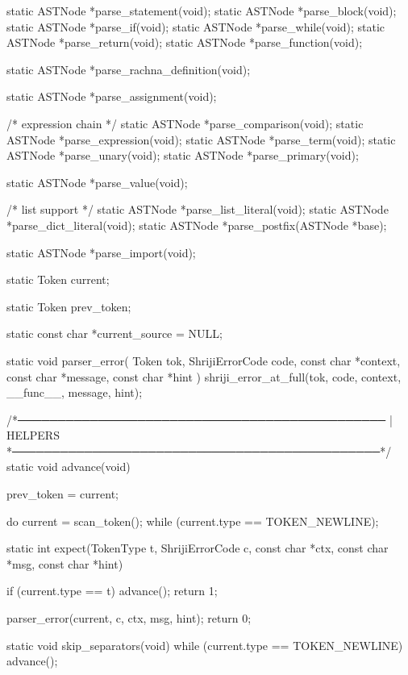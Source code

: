 \documentclass{article}
\begin{document}
static ASTNode *parse_statement(void);
static ASTNode *parse_block(void);
static ASTNode *parse_if(void);
static ASTNode *parse_while(void);
static ASTNode *parse_return(void);
static ASTNode *parse_function(void);

static ASTNode *parse_rachna_definition(void);

static ASTNode *parse_assignment(void);

/* expression chain */
static ASTNode *parse_comparison(void);
static ASTNode *parse_expression(void);
static ASTNode *parse_term(void);
static ASTNode *parse_unary(void);
static ASTNode *parse_primary(void);

static ASTNode *parse_value(void);

/* list support */
static ASTNode *parse_list_literal(void);
static ASTNode *parse_dict_literal(void);
static ASTNode *parse_postfix(ASTNode *base);

static ASTNode *parse_import(void);

static Token current;

static Token prev_token;

static const char *current_source = NULL;

static void parser_error(
    Token tok,
    ShrijiErrorCode code,
    const char *context,
    const char *message,
    const char *hint
)
{
    shriji_error_at_full(tok, code, context, __func__, message, hint);
}







/*──────────────────────────────────────────────
 | HELPERS
 *──────────────────────────────────────────────*/
static void advance(void)
{
    prev_token = current;

    do {
        current = scan_token();
    } while (current.type == TOKEN_NEWLINE);
}

static int expect(TokenType t, ShrijiErrorCode c,
                  const char *ctx, const char *msg, const char *hint)
{
    if (current.type == t) {
        advance();
        return 1;
    }

   parser_error(current, c, ctx, msg, hint);
    return 0;
}

static void skip_separators(void)
{
    while (current.type == TOKEN_NEWLINE) {
        advance();
    }
}
\end{document}

